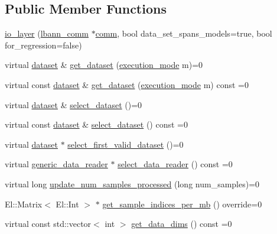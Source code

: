 \subsection*{Public Member Functions}
\begin{DoxyCompactItemize}
\item 
\hyperlink{classlbann_1_1io__layer_ab2b5002dfeb0806062ecf3d9fefb9948}{io\+\_\+layer} (\hyperlink{classlbann_1_1lbann__comm}{lbann\+\_\+comm} $\ast$\hyperlink{file__io_8cpp_ab048c6f9fcbcfaa57ce68b00263dbebe}{comm}, bool data\+\_\+set\+\_\+spans\+\_\+models=true, bool for\+\_\+regression=false)
\item 
virtual \hyperlink{classlbann_1_1dataset}{dataset} \& \hyperlink{classlbann_1_1io__layer_a027122c10603ede2ab9be779bad135f8}{get\+\_\+dataset} (\hyperlink{base_8hpp_a2781a159088df64ed7d47cc91c4dc0a8}{execution\+\_\+mode} m)=0
\item 
virtual const \hyperlink{classlbann_1_1dataset}{dataset} \& \hyperlink{classlbann_1_1io__layer_ac46dfddf41dc6915db433fe269b53770}{get\+\_\+dataset} (\hyperlink{base_8hpp_a2781a159088df64ed7d47cc91c4dc0a8}{execution\+\_\+mode} m) const =0
\item 
virtual \hyperlink{classlbann_1_1dataset}{dataset} \& \hyperlink{classlbann_1_1io__layer_a66acbfb9c03a2e89a751b420416ae3bf}{select\+\_\+dataset} ()=0
\item 
virtual const \hyperlink{classlbann_1_1dataset}{dataset} \& \hyperlink{classlbann_1_1io__layer_abbbeb6ca3e1d95b5c35dd9bb499bdd2d}{select\+\_\+dataset} () const =0
\item 
virtual \hyperlink{classlbann_1_1dataset}{dataset} $\ast$ \hyperlink{classlbann_1_1io__layer_a7dbc671fd5a81094854a4d865f7631ce}{select\+\_\+first\+\_\+valid\+\_\+dataset} ()=0
\item 
virtual \hyperlink{classlbann_1_1generic__data__reader}{generic\+\_\+data\+\_\+reader} $\ast$ \hyperlink{classlbann_1_1io__layer_aed46cd991ff11bad08933dc61492e26f}{select\+\_\+data\+\_\+reader} () const =0
\item 
virtual long \hyperlink{classlbann_1_1io__layer_a4ed831842ad78aaebfc9519c51268b95}{update\+\_\+num\+\_\+samples\+\_\+processed} (long num\+\_\+samples)=0
\item 
El\+::\+Matrix$<$ El\+::\+Int $>$ $\ast$ \hyperlink{classlbann_1_1io__layer_ab319ad5697e002072ee03e8c64523fb5}{get\+\_\+sample\+\_\+indices\+\_\+per\+\_\+mb} () override=0
\item 
virtual const std\+::vector$<$ int $>$ \hyperlink{classlbann_1_1io__layer_a67feb9fd903ef4d2ca782bbe7860a413}{get\+\_\+data\+\_\+dims} () const =0

\end{DoxyCompactItemize}
